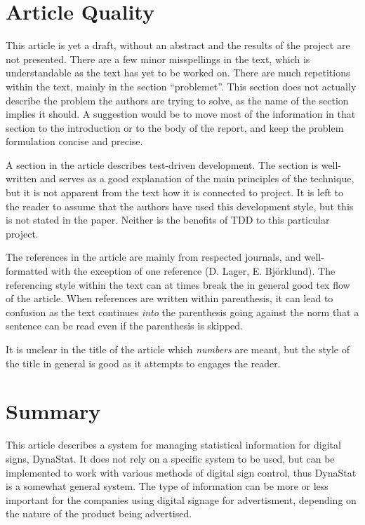 \documentclass[a4paper,10pt]{article}
\begin{document}
\section{Article Quality}
This article is yet a draft, without an abstract and the results of the project are not presented. There are a few minor misspellings in the text, which is understandable as the text has yet to be worked on. There are much repetitions within the text, mainly in the section ``problemet''. This section does not actually describe the problem the authors are trying to solve, as the name of the section implies it should. A suggestion would be to move most of the information in that section to the introduction or to the body of the report, and keep the problem formulation concise and precise.

A section in the article describes test-driven development. The section is well-written and serves as a good explanation of the main principles of the technique, but it is not apparent from the text how it is connected to project. It is left to the reader to assume that the authors have used this development style, but this is not stated in the paper. Neither is the benefits of TDD to this particular project.

The references in the article are mainly from respected journals, and well-formatted with the exception of one reference (D. Lager, E. Björklund). The referencing style within the text can at times break the in general good tex flow of the article. When references are written within parenthesis, it can lead to confusion as the text continues \emph{into} the parenthesis going against the norm that a sentence can be read even if the parenthesis is skipped.

It is unclear in the title of the article which \emph{numbers} are meant, but the style of the title in general is good as it attempts to engages the reader.


\section{Summary}
This article describes a system for managing statistical information for digital signs, DynaStat. It does not rely on a specific system to be used, but can be implemented to work with various methods of digital sign control, thus DynaStat is a somewhat general system. The type of information can be more or less important for the companies using digital signage for advertisment, depending on the nature of the product being advertised.
\end{document}
